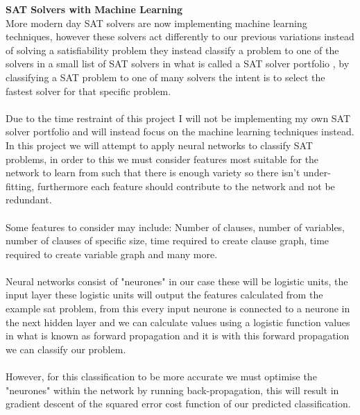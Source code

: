 \documentclass[12pt,a4paper]{article}
\begin{document}
{\bf SAT Solvers with Machine Learning}\\
More modern day SAT solvers are now implementing machine learning techniques, however these solvers act differently to our previous variations instead of solving a satisfiability problem they instead classify a problem to one of the solvers in a small list of SAT solvers in what is called a SAT solver portfolio \cite{satzilla}, by classifying a SAT problem to one of many solvers the intent is to select the fastest solver for that specific problem. \\\\
Due to the time restraint of this project I will not be implementing my own SAT solver portfolio and will instead focus on the machine learning techniques instead. In this project we will attempt to apply neural networks to classify SAT problems, in order to this we must consider features most suitable for the network to learn from such that there is enough variety so there isn't under-fitting, furthermore each feature should contribute to the network and not be redundant. \\\\ 
Some features \cite{machineLearningFeatures} to consider may include: Number of clauses, number of variables, number of clauses of specific size, time required to create clause graph, time required to create variable graph and many more.\\\\
Neural networks consist of "neurones" in our case these will be logistic units, the input layer these logistic units will output the features calculated from the example sat problem, from this every input neurone is connected to a neurone in the next hidden layer and we can calculate values using a logistic function values in what is known as forward propagation and it is with this forward propagation we can classify our problem.\\\\
However, for this classification to be more accurate we must optimise the "neurones" within the network by running back-propagation, this will result in gradient descent of the squared error cost function of our predicted classification.\\\\
\end{document}
